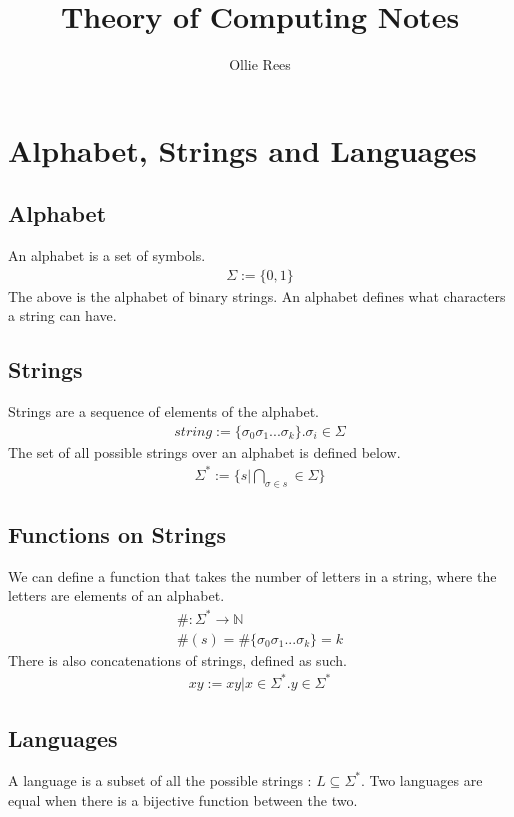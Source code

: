 \documentclass[12pt]{article}
\title{Theory of Computing Notes}
\author{Ollie Rees}
\begin{document}
	\maketitle
	\tableofcontents
	\section{Alphabet, Strings and Languages}
	\subsection{Alphabet}
	An alphabet is a set of symbols.
	\begin{eqnarray}
		\Sigma := \{0, 1\}
	\end{eqnarray}
	The above is the alphabet of binary strings. \newline
	An alphabet defines what characters a string can have.
	\subsection{Strings}
	Strings are a sequence of elements of the alphabet. 
	\begin{eqnarray}
		string := \{\sigma_0\sigma_1...\sigma_k\}. \sigma_i \in \Sigma
	\end{eqnarray}
	The set of all possible strings over an alphabet is defined below.
	\begin{eqnarray}
		\Sigma^{*} := \{s | \bigcap_{\sigma \in s} \in \Sigma\}
	\end{eqnarray}
	\subsection{Functions on Strings} 
	We can define a function that takes the number of letters in a string, where the letters are elements of an alphabet. 
	\begin{eqnarray}
		\# : \Sigma^* \rightarrow \mathbb{N} \\
		\#(s) = \#\{\sigma_0\sigma_1...\sigma_k\} = k
	\end{eqnarray}
	There is also concatenations of strings, defined as such.
	\begin{eqnarray}
		xy := {xy | x \in \Sigma^* . y \in \Sigma^*} 
	\end{eqnarray}
	\subsection{Languages} 
	A language is a subset of all the possible strings : $L \subseteq \Sigma^* $. \newline
	Two languages are equal when there is a bijective function between the two. \newline
\end{document}
